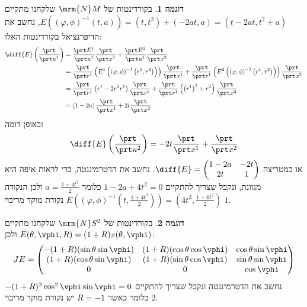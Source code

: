 \documentclass{article}
\theoremstyle{definition}
\newtheorem*{example*}{דוגמה}
\begin{document}
	\begin{example*}
		בקורדינטות של
		\(\mrm{N} M\)
		שלקחנו מתקיים
		\(
			E(\left(\varphi,\phi\right)^{-1}(t,a))
			=(t,t^2)+(-2at,a)
			=(t-2at,t^2+a)
		\),
		נחשב את הדיפרנציאל בקורדינטות האלו:
		\begin{equation*}\begin{split}
			\diff{E}\left(\frac{\prt}{\prt u^1}\right)
			&=\frac{\prt E^1}{\prt u^1} \frac{\prt}{\prt x^1}
			+\frac{\prt E^2}{\prt u^1} \frac{\prt}{\prt x^2}
			\\&=\frac{\prt}{\prt r^1}\left(E^1\left(\left(\varphi,\phi\right)^{-1}\left(r^1,r^2\right)\right)\right) \frac{\prt}{\prt x^1}
			+\frac{\prt}{\prt r^1}\left(E^2\left(\left(\varphi,\phi\right)^{-1}\left(r^1,r^2\right)\right)\right) \frac{\prt}{\prt x^2}
			\\&=\frac{\prt}{\prt r^1}\left(r^1-2r^2 r^1\right) \frac{\prt}{\prt x^1}
			+\frac{\prt}{\prt r^1}\left(\left(r^1\right)^2+r^2\right) \frac{\prt}{\prt x^2}
			\\&=\left(1-2a\right) \frac{\prt}{\prt x^1}
			+2t \frac{\prt}{\prt x^2}
		\end{split}\end{equation*}
		ובאופן דומה
		\[
			\diff{E}\left(\frac{\prt}{\prt u^2}\right)
			=-2t \frac{\prt}{\prt x^1}
			+\frac{\prt}{\prt x^2}
		\]
		או כמטריצה
		\(
			\diff{E}
			=\begin{pmatrix}
				1-2a & -2t
				\\
				2t & 1
			\end{pmatrix}
		\).
		נחשב את הדטרמיננטה, כדי לראות איפה היא מנוונת, ונקבל שצריך להתקיים
		\(1-2a+4t^2=0\)
		כלומר
		\(a=\frac{1+4t^2}{2}\)
		ולכן הנקודה
		\(
			E(\left(\varphi,\phi\right)^{-1}(t,\frac{1+4t^2}{2}))
			=\left(4t^3,\frac{1+6t^2}{2}\right)
		\)
		נקודת מוקד מריבוי \(1\).
	\end{example*}

	\begin{example*}
		בקורדינטות של
		\(\mrm{N} S^2\)
		שלקחנו מתקיים
		\(
		E(\theta,\vphi,R) = (1+R)x(\theta,\vphi)
		\)
		ולכן:
		\[
			JE = \begin{pmatrix}
				-(1+R)(\sin\theta \sin\vphi) & (1+R)(\cos\theta \cos\vphi) & \cos\theta \sin\vphi
				\\
				(1+R)(\cos\theta \sin\vphi) & (1+R)(\sin\theta \cos\vphi) & \sin\theta \sin\vphi
				\\
				0 & 0 & \cos \vphi
			\end{pmatrix}
		\]
		נחשב את הדטרמיננטה ונקבל שצריך להתקיים
		\(-(1+R)^2 \cos^2\vphi \sin\vphi=0\)
		כלומר כאשר
		\(R=-1\)
		יש נקודת מוקד מריבוי \(2\).
	\end{example*}
\end{document}
